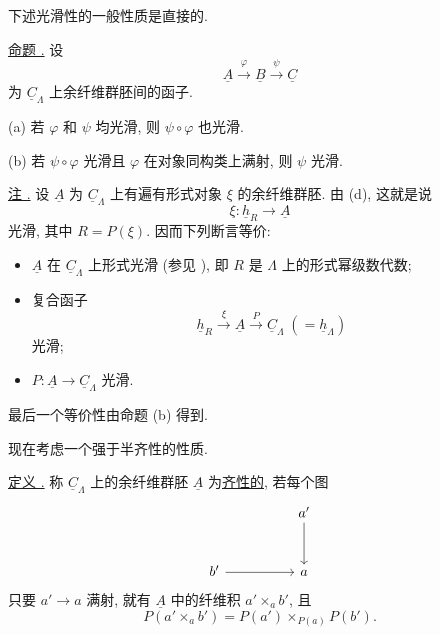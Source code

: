 下述光滑性的一般性质是直接的.

\underline{命题 .} 设
\[
 \underline A\xrightarrow{\ \varphi\ }\underline B
 \xrightarrow{\ \psi\ }\underline C
\]
为 $\underline C_\Lambda$ 上余纤维群胚间的函子.

(a) 若 $\varphi$ 和 $\psi$ 均光滑, 则 $\psi\circ\varphi$ 也光滑.

(b) 若 $\psi\circ\varphi$ 光滑且 $\varphi$ 在对象同构类上满射, 则 $\psi$ 光滑.


\underline{注 .}
设 $\underline A$ 为 $\underline C_\Lambda$ 上有遍有形式对象 $\xi$ 的余纤维群胚.
由 (d), 这就是说
\[
 \xi:\underline h_R\longrightarrow\underline A
\]
光滑, 其中 $R=P(\xi)$. 因而下列断言等价:

\begin{itemize}
\item $\underline A$ 在 $\underline C_\Lambda$ 上形式光滑
      (参见 ),
      即 $R$ 是 $\Lambda$ 上的形式幂级数代数;
\item 复合函子
      \[
       \underline h_R\xrightarrow{\ \xi\ }\underline A
       \xrightarrow{\ P\ }\underline C_\Lambda
       \;(=\underline h_\Lambda)
      \]
      光滑;
\item $P:\underline A\longrightarrow\underline C_\Lambda$ 光滑.
\end{itemize}
最后一个等价性由命题 (b) 得到.

现在考虑一个强于半齐性的性质.

\underline{定义 .}
称 $\underline C_\Lambda$ 上的余纤维群胚 $\underline A$ 为\underline{齐性的},
若每个图
\[
\begin{tikzcd}[row sep=large,column sep=huge]
 & a' \arrow[d]\\
 b' \arrow[r] & a
\end{tikzcd}
\]
只要 $a'\longrightarrow a$ 满射, 就有 $\underline A$ 中的纤维积
$a'\times_a b'$, 且
\[
 P(a'\times_a b')=
 P(a')\times_{P(a)}P(b').
\]

